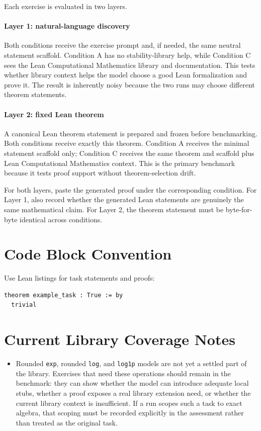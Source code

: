 \documentclass[11pt]{article}
\begin{document}
Each exercise is evaluated in two layers.

\paragraph{Layer 1: natural-language discovery}
Both conditions receive the exercise prompt and, if needed, the same neutral
statement scaffold.  Condition A has no stability-library help, while Condition
C sees the Lean Computational Mathematics library and documentation.  This tests whether library
context helps the model choose a good Lean formalization and prove it.  The
result is inherently noisy because the two runs may choose different theorem
statements.

\paragraph{Layer 2: fixed Lean theorem}
A canonical Lean theorem statement is prepared and frozen before benchmarking.
Both conditions receive exactly this theorem.  Condition A receives the minimal
statement scaffold only; Condition C receives the same theorem and scaffold plus
Lean Computational Mathematics context.  This is the primary benchmark because it tests proof
support without theorem-selection drift.

For both layers, paste the generated proof under the corresponding condition.
For Layer 1, also record whether the generated Lean statements are genuinely
the same mathematical claim.  For Layer 2, the theorem statement must be byte-for-byte
identical across conditions.

\section{Code Block Convention}

Use Lean listings for task statements and proofs:

\begin{lstlisting}
theorem example_task : True := by
  trivial
\end{lstlisting}

\section{Current Library Coverage Notes}

\begin{itemize}
  \item Rounded \texttt{exp}, rounded \texttt{log}, and \texttt{log1p} models are
  not yet a settled part of the library.  Exercises that need these operations
  should remain in the benchmark: they can show whether the model can introduce
  adequate local stubs, whether a proof exposes a real library extension need,
  or whether the current library context is insufficient.  If a run scopes such
  a task to exact algebra, that scoping must be recorded explicitly in the
  assessment rather than treated as the original task.
\end{itemize}
\end{document}
